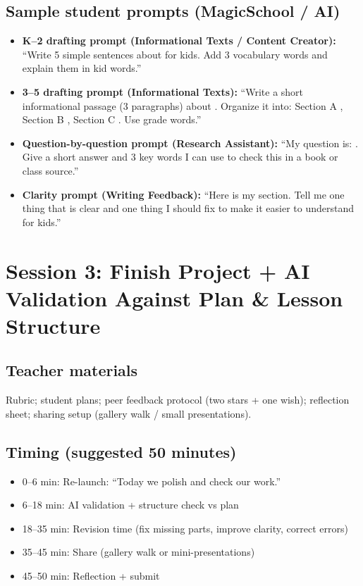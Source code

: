 \documentclass[11pt]{article}
\newcommand{\Session}[1]{\section*{#1}}
\newcommand{\Sub}[1]{\subsection*{#1}}
\begin{document}
\Sub{Sample student prompts (MagicSchool / AI)}
\begin{itemize}[leftmargin=*]
  \item \textbf{K--2 drafting prompt (Informational Texts / Content Creator):}
  ``Write 5 simple sentences about \underline{\hspace{2cm}} for kids. Add 3 vocabulary words and explain them in kid words.''
  \item \textbf{3--5 drafting prompt (Informational Texts):}
  ``Write a short informational passage (3 paragraphs) about \underline{\hspace{2cm}}. Organize it into: Section A \underline{\hspace{2cm}}, Section B \underline{\hspace{2cm}}, Section C \underline{\hspace{2cm}}. Use grade \underline{\hspace{1cm}} words.''
  \item \textbf{Question-by-question prompt (Research Assistant):}
  ``My question is: \underline{\hspace{6cm}}. Give a short answer and 3 key words I can use to check this in a book or class source.''
  \item \textbf{Clarity prompt (Writing Feedback):}
  ``Here is my section. Tell me one thing that is clear and one thing I should fix to make it easier to understand for kids.'' 
\end{itemize}

\newpage
\Session{Session 3: Finish Project + AI Validation Against Plan \& Lesson Structure}
\Sub{Teacher materials}
Rubric; student plans; peer feedback protocol (two stars + one wish); reflection sheet; sharing setup (gallery walk / small presentations).

\Sub{Timing (suggested 50 minutes)}
\begin{itemize}[leftmargin=*]
  \item 0--6 min: Re-launch: ``Today we polish and check our work.''
  \item 6--18 min: AI validation + structure check vs plan
  \item 18--35 min: Revision time (fix missing parts, improve clarity, correct errors)
  \item 35--45 min: Share (gallery walk or mini-presentations)
  \item 45--50 min: Reflection + submit
\end{itemize}
\end{document}
